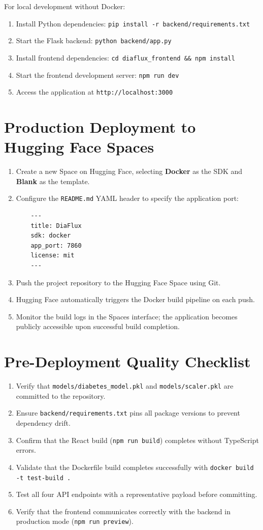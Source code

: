\documentclass[12pt,a4paper]{report}
\begin{document}
For local development without Docker:
\begin{enumerate}
    \item Install Python dependencies: \texttt{pip install -r backend/requirements.txt}
    \item Start the Flask backend: \texttt{python backend/app.py}
    \item Install frontend dependencies: \texttt{cd diaflux\_frontend \&\& npm install}
    \item Start the frontend development server: \texttt{npm run dev}
    \item Access the application at \texttt{http://localhost:3000}
\end{enumerate}

\section{Production Deployment to Hugging Face Spaces}
\begin{enumerate}
    \item Create a new Space on Hugging Face, selecting \textbf{Docker} as the SDK and \textbf{Blank} as the template.
    \item Configure the \texttt{README.md} YAML header to specify the application port:
    \begin{lstlisting}
    ---
    title: DiaFlux
    sdk: docker
    app_port: 7860
    license: mit
    ---
    \end{lstlisting}
    \item Push the project repository to the Hugging Face Space using Git.
    \item Hugging Face automatically triggers the Docker build pipeline on each push.
    \item Monitor the build logs in the Spaces interface; the application becomes publicly accessible upon successful build completion.
\end{enumerate}

\section{Pre-Deployment Quality Checklist}
\begin{enumerate}
    \item Verify that \texttt{models/diabetes\_model.pkl} and \texttt{models/scaler.pkl} are committed to the repository.
    \item Ensure \texttt{backend/requirements.txt} pins all package versions to prevent dependency drift.
    \item Confirm that the React build (\texttt{npm run build}) completes without TypeScript errors.
    \item Validate that the Dockerfile build completes successfully with \texttt{docker build -t test-build .}
    \item Test all four API endpoints with a representative payload before committing.
    \item Verify that the frontend communicates correctly with the backend in production mode (\texttt{npm run preview}).
\end{enumerate}
\end{document}
